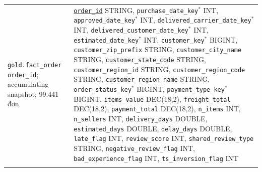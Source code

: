 \documentclass[a4paper]{article}
\begin{document}
{\begin{longtable}{@{}>{\raggedright\arraybackslash}p{3.6cm}>{\raggedright\arraybackslash}p{12.6cm}@{}}
\texttt{gold.fact\_\allowbreak{}order} \newline 1 \texttt{order\_\allowbreak{}id}; accumulating snapshot; 99.441 đơn & \underline{\texttt{order\_\allowbreak{}id}} STRING, \texttt{purchase\_\allowbreak{}date\_\allowbreak{}key}$^{*}$ INT, \texttt{approved\_\allowbreak{}date\_\allowbreak{}key}$^{*}$ INT, \texttt{delivered\_\allowbreak{}carrier\_\allowbreak{}date\_\allowbreak{}key}$^{*}$ INT, \texttt{delivered\_\allowbreak{}customer\_\allowbreak{}date\_\allowbreak{}key}$^{*}$ INT, \texttt{estimated\_\allowbreak{}date\_\allowbreak{}key}$^{*}$ INT, \texttt{customer\_\allowbreak{}key}$^{*}$ BIGINT, \texttt{customer\_\allowbreak{}zip\_\allowbreak{}prefix} STRING, \texttt{customer\_\allowbreak{}city\_\allowbreak{}name} STRING, \texttt{customer\_\allowbreak{}state\_\allowbreak{}code} STRING, \texttt{customer\_\allowbreak{}region\_\allowbreak{}id} STRING, \texttt{customer\_\allowbreak{}region\_\allowbreak{}code} STRING, \texttt{customer\_\allowbreak{}region\_\allowbreak{}name} STRING, \texttt{order\_\allowbreak{}status\_\allowbreak{}key}$^{*}$ BIGINT, \texttt{payment\_\allowbreak{}type\_\allowbreak{}key}$^{*}$ BIGINT, \texttt{items\_\allowbreak{}value} DEC(18,2), \texttt{freight\_\allowbreak{}total} DEC(18,2), \texttt{payment\_\allowbreak{}total} DEC(18,2), \texttt{n\_\allowbreak{}items} INT, \texttt{n\_\allowbreak{}sellers} INT, \texttt{delivery\_\allowbreak{}days} DOUBLE, \texttt{estimated\_\allowbreak{}days} DOUBLE, \texttt{delay\_\allowbreak{}days} DOUBLE, \texttt{late\_\allowbreak{}flag} INT, \texttt{review\_\allowbreak{}score} INT, \texttt{shared\_\allowbreak{}review\_\allowbreak{}type} STRING, \texttt{negative\_\allowbreak{}review\_\allowbreak{}flag} INT, \texttt{bad\_\allowbreak{}experience\_\allowbreak{}flag} INT, \texttt{ts\_\allowbreak{}inversion\_\allowbreak{}flag} INT \\
\addlinespace

\end{longtable}}
\end{document}
